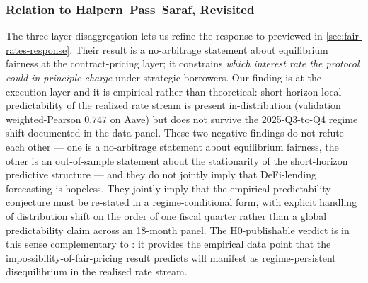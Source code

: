 \subsubsection{Relation to Halpern--Pass--Saraf, Revisited}
\label{sec:disc-impossibility}

The three-layer disaggregation lets us refine the response to
\cite{halpern2024fairrates} previewed in \cref{sec:fair-rates-response}.
Their result is a no-arbitrage statement about equilibrium fairness
at the contract-pricing layer; it constrains \emph{which interest
rate the protocol could in principle charge} under strategic
borrowers. Our finding is at the execution layer and it is
empirical rather than theoretical: short-horizon local
predictability of the realized rate stream is present
in-distribution (validation weighted-Pearson $0.747$ on Aave) but
does not survive the 2025-Q3-to-Q4 regime shift documented in the
data panel. These two negative findings do not refute each other ---
one is a no-arbitrage statement about equilibrium fairness, the
other is an out-of-sample statement about the stationarity of the
short-horizon predictive structure --- and they do not jointly
imply that DeFi-lending forecasting is hopeless. They jointly
imply that the empirical-predictability conjecture must be
re-stated in a regime-conditional form, with explicit handling of
distribution shift on the order of one fiscal quarter rather than
a global predictability claim across an 18-month panel. The
H0-publishable verdict is in this sense complementary to
\cite{halpern2024fairrates}: it provides the empirical data point
that the impossibility-of-fair-pricing result predicts will
manifest as regime-persistent disequilibrium in the realised rate
stream.
